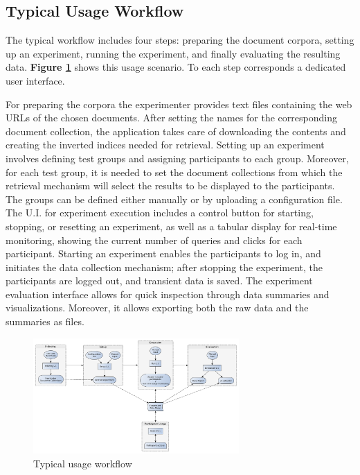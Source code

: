\documentclass[a4paper]{usiinfbachelorproject}
\begin{document}
\subsection{\textbf{Typical Usage Workflow}} \label{sec:designWorkflow}

The typical workflow includes four steps: preparing the document corpora, setting up an experiment, running the experiment,
and finally evaluating the resulting data. \textbf{Figure \ref{fig:usage}} shows this usage scenario. 
To each step corresponds a dedicated user interface. 

For preparing the corpora the experimenter provides text files containing the web URLs of the chosen documents. After setting the names for the
corresponding document collection, the application takes care of downloading the contents and creating the inverted indices needed for retrieval.
Setting up an experiment involves defining test groups and assigning participants to each group. Moreover, for each test group, it is needed
to set the document collections from which the retrieval mechanism will select the results to be displayed to the participants.
The groups can be defined either manually or by uploading a configuration file.
The U.I. for experiment execution includes a control button for starting, stopping, or resetting an experiment, as well 
as a tabular display for real-time monitoring, showing the current number of queries and clicks for each participant.
Starting an experiment enables the participants to log in, and initiates the data collection mechanism; after
stopping the experiment, the participants are logged out, and transient data is saved.
The experiment evaluation interface  allows for quick inspection through data summaries and visualizations. Moreover, it allows
exporting both the raw data and the summaries as files.

\begin{figure}[h]
\centering
\includegraphics[width=0.7\textwidth]{figures/usage}
\caption{Typical usage workflow}
\label{fig:usage}
\end{figure}
\end{document}
